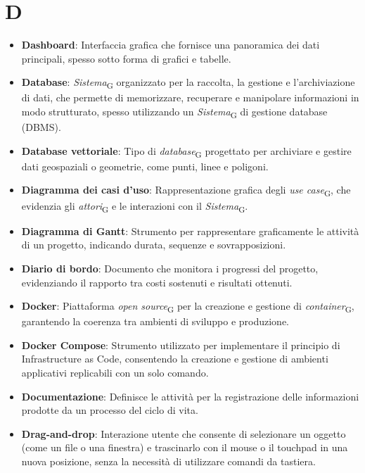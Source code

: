 \section{D}
\begin{itemize}
    \item \textbf{Dashboard}: Interfaccia grafica che fornisce una panoramica dei dati principali, spesso sotto forma di grafici e tabelle.
    \item \textbf{Database}: \textit{Sistema}\textsubscript{G} organizzato per la raccolta, la gestione e l'archiviazione di dati, che permette di memorizzare, recuperare e manipolare informazioni in modo strutturato, spesso utilizzando un \textit{Sistema}\textsubscript{G} di gestione database (DBMS).
    \item \textbf{Database vettoriale}: Tipo di \textit{database}\textsubscript{G} progettato per archiviare e gestire dati geospaziali o geometrie, come punti, linee e poligoni.
    \item \textbf{Diagramma dei casi d’uso}: Rappresentazione grafica degli \textit{use case}\textsubscript{G}, che evidenzia gli \textit{attori}\textsubscript{G} e le interazioni con il \textit{Sistema}\textsubscript{G}.
    \item \textbf{Diagramma di Gantt}: Strumento per rappresentare graficamente le attività di un progetto, indicando durata, sequenze e sovrapposizioni.
    \item \textbf{Diario di bordo}: Documento che monitora i progressi del progetto, evidenziando il rapporto tra costi sostenuti e risultati ottenuti.
    \item \textbf{Docker}: Piattaforma \textit{open source}\textsubscript{G} per la creazione e gestione di \textit{container}\textsubscript{G}, garantendo la coerenza tra ambienti di sviluppo e produzione.
    \item \textbf{Docker Compose}: Strumento utilizzato per implementare il principio di Infrastructure as Code, consentendo la creazione e gestione di ambienti applicativi replicabili con un solo comando.
    \item \textbf{Documentazione}: Definisce le attività per la registrazione delle informazioni prodotte da un processo del ciclo di vita.
    \item \textbf{Drag-and-drop}: Interazione utente che consente di selezionare un oggetto (come un file o una finestra) e trascinarlo con il mouse o il touchpad in una nuova posizione, senza la necessità di utilizzare comandi da tastiera.
\end{itemize}

